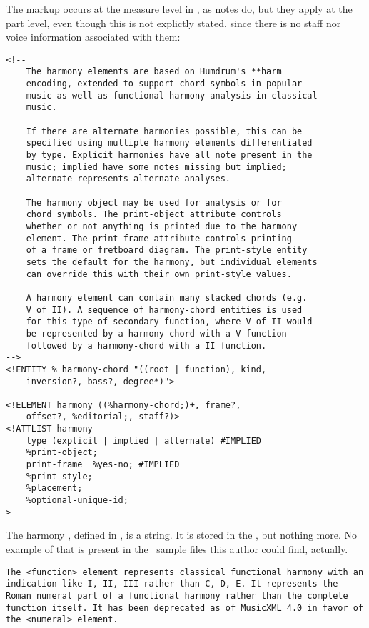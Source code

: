The  markup occurs at the measure level in \mxml, as notes do, but they apply at the part level, even though this is not explictly stated, since there is no staff nor voice information associated with them:
\begin{lstlisting}[language=Terminal]
<!--
	The harmony elements are based on Humdrum's **harm
	encoding, extended to support chord symbols in popular
	music as well as functional harmony analysis in classical
	music.

	If there are alternate harmonies possible, this can be
	specified using multiple harmony elements differentiated
	by type. Explicit harmonies have all note present in the
	music; implied have some notes missing but implied;
	alternate represents alternate analyses.

	The harmony object may be used for analysis or for
	chord symbols. The print-object attribute controls
	whether or not anything is printed due to the harmony
	element. The print-frame attribute controls printing
	of a frame or fretboard diagram. The print-style entity
	sets the default for the harmony, but individual elements
	can override this with their own print-style values.

	A harmony element can contain many stacked chords (e.g.
	V of II). A sequence of harmony-chord entities is used
	for this type of secondary function, where V of II would
	be represented by a harmony-chord with a V function
	followed by a harmony-chord with a II function.
-->
<!ENTITY % harmony-chord "((root | function), kind,
	inversion?, bass?, degree*)">

<!ELEMENT harmony ((%harmony-chord;)+, frame?,
	offset?, %editorial;, staff?)>
<!ATTLIST harmony
    type (explicit | implied | alternate) #IMPLIED
    %print-object;
    print-frame  %yes-no; #IMPLIED
    %print-style;
    %placement;
    %optional-unique-id;
>
\end{lstlisting}

The harmony , defined in \mxml, is a string. It is stored in the , but nothing more. No example of that is present in the \mxml\ sample files this author could find, actually.
\begin{lstlisting}[language=Terminal]
The <function> element represents classical functional harmony with an indication like I, II, III rather than C, D, E. It represents the Roman numeral part of a functional harmony rather than the complete function itself. It has been deprecated as of MusicXML 4.0 in favor of the <numeral> element.
\end{lstlisting}


